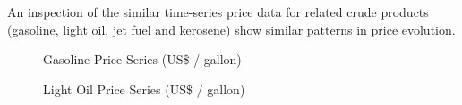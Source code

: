 \documentclass[a4paper,10pt]{article}
\begin{document}
An inspection of the similar time-series price data for related crude products (gasoline, light oil, jet fuel and kerosene) show similar patterns in price evolution.

\begin{figure}[!h]
    \centering
	\noindent{}
	\caption[Oil Price]{Gasoline Price Series (US\$ / gallon)}
    \label{fig:oilprice4}
\end{figure}

\begin{figure}[!h]
    \centering
	\noindent{}
	\caption[Oil Price]{Light Oil Price Series (US\$ / gallon)}
    \label{fig:oilprice5}
\end{figure}
\end{document}
